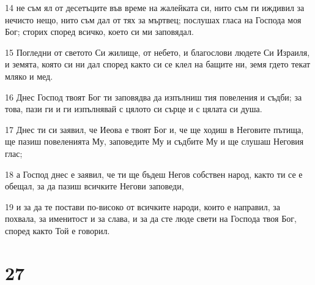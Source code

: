 \par 14 не съм ял от десетъците във време на жалейката си, нито съм ги иждивил за нечисто нещо, нито съм дал от тях за мъртвец; послушах гласа на Господа моя Бог; сторих според всичко, което си ми заповядал.
\par 15 Погледни от светото Си жилище, от небето, и благослови людете Си Израиля, и земята, която си ни дал според както си се клел на бащите ни, земя гдето текат мляко и мед.
\par 16 Днес Господ твоят Бог ти заповядва да изпълниш тия повеления и съдби; за това, пази ги и ги изпълнявай с цялото си сърце и с цялата си душа.
\par 17 Днес ти си заявил, че Иеова е твоят Бог и, че ще ходиш в Неговите пътища, ще пазиш повеленията Му, заповедите Му и съдбите Му и ще слушаш Неговия глас;
\par 18 а Господ днес е заявил, че ти ще бъдеш Негов собствен народ, както ти се е обещал, за да пазиш всичките Негови заповеди,
\par 19 и за да те постави по-високо от всичките народи, които е направил, за похвала, за именитост и за слава, и за да сте люде свети на Господа твоя Бог, според както Той е говорил.

\chapter{27}

